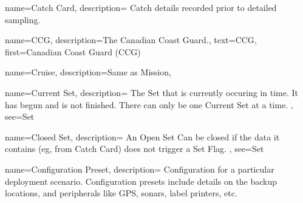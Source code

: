  {
    name=Catch Card,
    description={
        Catch details recorded prior to detailed sampling.
    }
}

 {
    name=CCG,
    description={The Canadian Coast Guard.},
    text={CCG},
    first={Canadian Coast Guard (CCG)}
}

 {
    name=Cruise,
    description={Same as \gls{Mission}},
}

 {
    name=Current Set,
    description={
        The \gls{Set} that is currently occuring in time.
        It has begun and is not finished.
        There can only be one \gls{Current Set} at a time.
    },
    see={Set}
}

 {
    name=Closed Set,
    description={
        An \gls{Open Set} Can be closed if the data it contains (eg, from \gls{Catch Card}) does not trigger a \gls{Set Flag}.
    },
    see={Set}
}

 {
    name=Configuration Preset,
    description={
        Configuration for a particular deployment scenario. Configuration presets include details on the backup locations, and peripherals like GPS, sonars, label printers, etc.
    }
}








